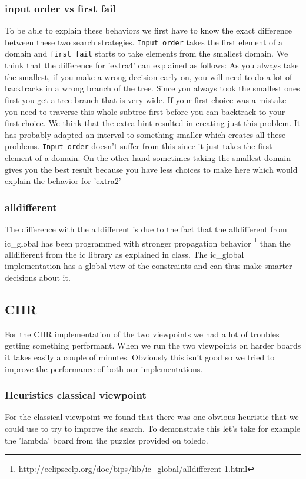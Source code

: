 \documentclass{report}
\begin{document}
\subsubsection{input order vs first fail}
To be able to explain these behaviors we first have to know the exact difference between these two search strategies. \texttt{Input order} takes the first element of a domain and \texttt{first fail} starts to take elements from the smallest domain. We think that the difference for 'extra4' can explained as follows: As you always take the smallest, if you make a wrong decision early on, you will need to do a lot of backtracks in a wrong branch of the tree. Since you always took the smallest ones first you get a tree branch that is very wide. If your first choice was a mistake you need to traverse this whole subtree first before you can backtrack to your first choice. We think that the extra hint resulted in creating just this problem. It has probably adapted an interval to something smaller which creates all these problems. \texttt{Input order} doesn't suffer from this since it just takes the first element of a domain. On the other hand sometimes taking the smallest domain gives you the best result because you have less choices to make here which would explain the behavior for 'extra2'

\subsubsection{alldifferent}
The difference with the alldifferent is due to the fact that the alldifferent from ic\_global has been programmed with stronger propagation behavior \footnote{\url{http://eclipseclp.org/doc/bips/lib/ic\_global/alldifferent-1.html}} than the alldifferent from the ic library as explained in class. The ic\_global implementation has a global view of the constraints and can thus make smarter decisions about it.
\newpage
\subsection{CHR}
\label{sub:CHR}

For the CHR implementation of the two viewpoints we had a lot of troubles getting something performant. When we run the two viewpoints on harder boards it takes easily a couple of minutes. Obviously this isn't good so we tried to improve the performance of both our implementations.

\subsubsection{Heuristics classical viewpoint}
For the classical viewpoint we found that there was one obvious heuristic that we could use to try to improve the search.
To demonstrate this let's take for example the 'lambda' board from the puzzles provided on toledo.
\end{document}

